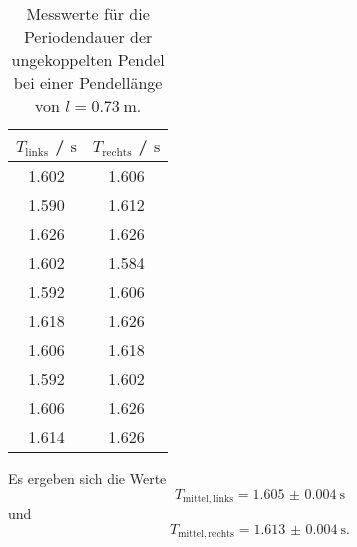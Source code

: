 \begin{table}
	\centering
	\caption{Messwerte für die Periodendauer der ungekoppelten Pendel bei einer Pendellänge von $l=\SI{0.73}{\meter}$.}
	\label{tab:rivaldo}
	\begin{tabular}{cc}
		\toprule
		$T_{\mathrm{links}}$ / $ \si{\second}$ & $T_{\mathrm{rechts}}$ / $\si{\second}$ \\
		\midrule
		1.602                                  & 1.606                                  \\
		1.590                                  & 1.612                                  \\
		1.626                                  & 1.626                                  \\
		1.602                                  & 1.584                                  \\
		1.592                                  & 1.606                                  \\
		1.618                                  & 1.626                                  \\
		1.606                                  & 1.618                                  \\
		1.592                                  & 1.602                                  \\
		1.606                                  & 1.626                                  \\
		1.614                                  & 1.626                                  \\
		\bottomrule
	\end{tabular}
\end{table}

Es ergeben sich die Werte
\begin{equation*}
	T_{\mathrm{mittel,links}} = \SI{1.605(4)}{\second}
\end{equation*}
und
\begin{equation*}
	T_{\mathrm{mittel,rechts}} = \SI{1.613(4)}{\second} \mathrm{.}
\end{equation*}


